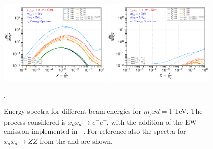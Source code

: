 \documentclass[epj,nopacs,fleqn]{svjour}
\begin{document}
\begin{figure}[!h]
	\subfigure
	{ \includegraphics[width=0.49\textwidth]{Fig/xdxd_ee_eeZ_eveW/1_neutrinos_mu_ee_eeZ_eveW_1.pdf}}
		\subfigure
	{ \includegraphics[width=0.49\textwidth]{Fig/xdxd_ee_eeZ_eveW/1_neutrinos_tau_ee_eeZ_eveW_1.pdf}}
	\caption{Energy spectra for different beam energies for  $m_/xd=$1 TeV. The process considered is  $x_d x_d \rightarrow e^- e^+ $, with the addition of the EW emission implemented in \MG~. For reference also the spectra for $x_d x_d \rightarrow ZZ $ from the \PPPC and \PPPCew are shown. }.
	\label{spec_eeMGew1}
\end{figure}


\clearpage
\end{document}
